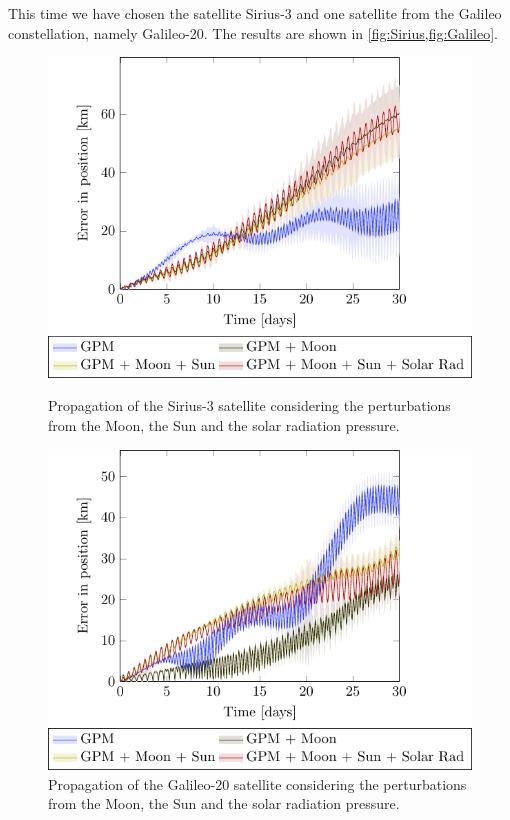 \documentclass[../main.tex]{subfiles}
\begin{document}
This time we have chosen the satellite Sirius-3 and one satellite from the Galileo constellation, namely Galileo-20. The results are shown in \cref{fig:Sirius,fig:Galileo}.
\begin{figure}[ht]
  \centering
  \begin{minipage}[ht]{0.45\textwidth}
    \centering
    \includegraphics[width=\textwidth]{Images/simulation/SIRIUS.pdf}
    \caption{Propagation of the Sirius-3 satellite considering the perturbations from the Moon, the Sun and the solar radiation pressure.}
    \label{fig:Sirius}
  \end{minipage}
  \hspace{0.0333333\textwidth}
  \begin{minipage}[ht]{0.45\textwidth}
    \centering
    \includegraphics[width=\textwidth]{Images/simulation/GALILEO.pdf}
    \caption{Propagation of the Galileo-20 satellite considering the perturbations from the Moon, the Sun and the solar radiation pressure.}
    \label{fig:Galileo}
  \end{minipage}
\end{figure}
\end{document}
